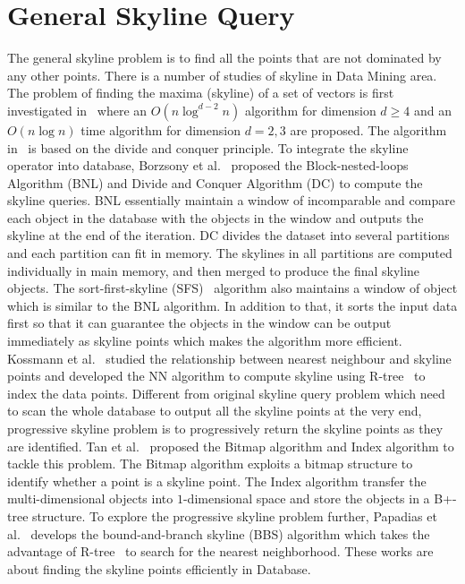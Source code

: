 \section{General Skyline Query}
\label{sec:rel:general}
The general skyline problem is to find all the points that are not dominated by any other points.
There is a number of studies of skyline in Data Mining area. The problem of finding the maxima (skyline) of a set of vectors is first investigated in~\cite{kung1975finding} where an $O(n\log ^{d-2}n)$ algorithm for dimension $d\geq 4$ and an $O(n\log n)$ time algorithm for dimension $d = 2, 3$ are proposed. The algorithm in~\cite{kung1975finding} is based on the divide and conquer principle. To integrate the skyline operator into database, Borzsony et al.~\cite{borzsony2001skyline} proposed the Block-nested-loops Algorithm (BNL) and Divide and Conquer Algorithm (DC) to compute the skyline queries. BNL essentially maintain a window of incomparable and compare each object in the database with the objects in the window and outputs the skyline at the end of the iteration. DC divides the dataset into several partitions and each partition can fit in memory. The skylines in all partitions are computed individually in main memory, and then merged to produce the final skyline objects. 
The sort-first-skyline (SFS)~\cite{chomicki2003skyline} algorithm also maintains a window of object which is similar to the BNL algorithm. In addition to that, it sorts the input data first so that it can guarantee the objects in the window can be output immediately as skyline points which makes the algorithm more efficient.
Kossmann et al.~\cite{kossmann2002shooting} studied the relationship between nearest neighbour and skyline points and developed the NN algorithm to compute skyline using R-tree~\cite{beckmann1990r} to index the data points.
Different from original skyline query problem which need to scan the whole database to output all the skyline points at the very end, progressive skyline problem is to progressively return the skyline points as they are identified. Tan et al.~\cite{tan2001efficient} proposed the Bitmap algorithm and Index algorithm to tackle this problem. The Bitmap algorithm exploits a bitmap structure to identify whether a point is a skyline point. The Index algorithm transfer the multi-dimensional objects into $1$-dimensional space and store the objects in a B+-tree structure. To explore the progressive skyline problem further, Papadias et al.~\cite{papadias2003optimal, papadias2005progressive} develops the bound-and-branch skyline (BBS) algorithm which takes the advantage of R-tree~\cite{beckmann1990r} to search for the nearest neighborhood. These works are about finding the skyline points efficiently in Database. 


